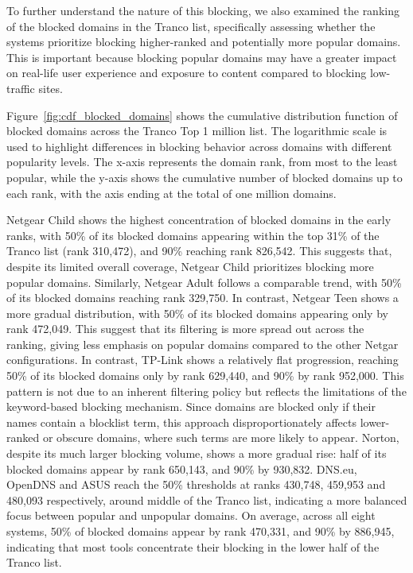 To further understand the nature of this blocking, we also examined the ranking of the blocked domains in the Tranco list, specifically assessing whether the systems prioritize blocking higher-ranked and potentially more popular domains.
This is important because blocking popular domains may have a greater impact on real-life user experience and exposure to content compared to blocking low-traffic sites.

Figure~\ref{fig:cdf_blocked_domains} shows the cumulative distribution function of blocked domains across the Tranco Top 1 million list. The logarithmic scale is used to highlight differences in blocking behavior across domains with different popularity levels.
The x-axis represents the domain rank, from most to the least popular, while the y-axis shows the cumulative number of blocked domains up to each rank, with the axis ending at the total of one million domains.



Netgear Child shows the highest concentration of blocked domains in the early ranks, with 50\% of its blocked domains appearing within the top 31\% of the Tranco list (rank 310,472), and 90\% reaching rank 826,542. This suggests that, despite its limited overall coverage, Netgear Child prioritizes blocking more popular domains. Similarly, Netgear Adult follows a comparable trend, with 50\% of its blocked domains reaching rank 329,750.
In contrast, Netgear Teen shows a more gradual distribution, with 50\% of its blocked domains appearing only by rank 472,049. This suggest that its filtering is more spread out across the ranking, giving less emphasis on popular domains compared to the other Netgar configurations.
In contrast, TP-Link shows a relatively flat progression, reaching 50\% of its blocked domains only by rank 629,440, and 90\% by rank 952,000. This pattern is not due to an inherent filtering policy but reflects the limitations of the keyword-based blocking mechanism. Since domains are blocked only if their names contain a blocklist term, this approach disproportionately affects lower-ranked or obscure domains, where such terms are more likely to appear.
Norton, despite its much larger blocking volume, shows a more gradual rise: half of its blocked domains appear by rank 650,143, and 90\% by 930,832. 
DNS.eu, OpenDNS  and ASUS reach the 50\% thresholds at ranks 430,748, 459,953 and 480,093 respectively, around middle of the Tranco list, indicating a more balanced focus between popular and unpopular domains.
On average, across all eight systems, 50\% of blocked domains appear by rank 470,331, and 90\% by 886,945, indicating that most tools concentrate their blocking in the lower half of the Tranco list.

